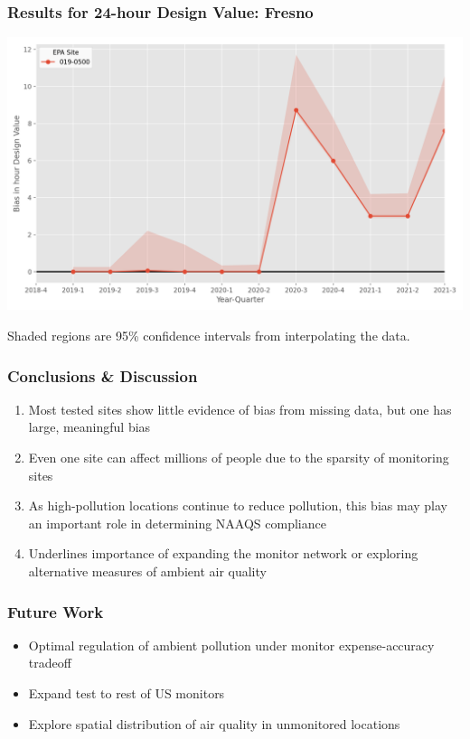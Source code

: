 \documentclass{beamer}
\begin{document}
\begin{frame}
\frametitle{Results for 24-hour Design Value: Fresno}


\includegraphics[width=\textwidth]{output/figures/final_results/DV_hour_plot_site_019-0500.png}

{\small Shaded regions are 95\% confidence intervals from interpolating the data.}
\end{frame}


\begin{frame}
\frametitle{Conclusions \& Discussion}
\begin{enumerate}
\setlength\itemsep{2em}
    \item Most tested sites show little evidence of bias from missing data, but one has large, meaningful bias
    \item Even one site can affect millions of people due to the sparsity of monitoring sites
    \item As high-pollution locations continue to reduce pollution, this bias may play an important role in determining NAAQS compliance
    \item Underlines importance of expanding the monitor network or exploring alternative measures of ambient air quality
\end{enumerate}
\end{frame}


\begin{frame}
\frametitle{Future Work}

\begin{itemize}
\setlength\itemsep{2em}
    \item Optimal regulation of ambient pollution under monitor expense-accuracy tradeoff
    \item Expand test to rest of US monitors
    \item Explore spatial distribution of air quality in unmonitored locations
\end{itemize}

\end{frame}
\end{document}
